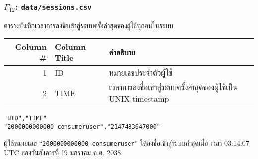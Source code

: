 \begin{minipage}{\textwidth}
\subsubsection[\texttt{data/sessions.csv}]{\texorpdfstring{$ F_{12} $}{File \#12}: \texttt{data/sessions.csv}}\label{subsubsec:csv-f12}

ตารางบันทึกเวลาการลงชื่อเข้าสู่ระบบครั้งล่าสุดของผู้ใช้ทุกคนในระบบ

\begin{tabular}[!hbt]{| r | >{\ttfamily}p{15ex}<{\rmfamily} | p{36ex} |}
\hline
Column \#       & \rmfamily Column Title                & คำอธิบาย\\
\hline
1               & ID                                    & หมายเลขประจำตัวผู้ใช้\\
2               & TIME                                  & เวลาการลงชื่อเข้าสู่ระบบครั้งล่าสุดของผู้ใช้เป็น UNIX timestamp\\
\hline
\end{tabular}


\begin{lstlisting}[caption={\texttt{data/sessions.csv}}]
"UID","TIME"
"2000000000000-consumeruser","2147483647000"
\end{lstlisting}

\begin{description}[labelwidth=*]
    \item[$ \Rightarrow $] ผู้ใช้หมายเลข ``\texttt{2000000000000-consumeruser}'' ได้ลงชื่อเข้าสู่ระบบล่าสุดเมื่อ
เวลา 03:14:07 UTC ของวันอังคารที่ 19 มกราคม ค.ศ. 2038
\end{description}
\end{minipage}


\vspace{3\baselineskip}


